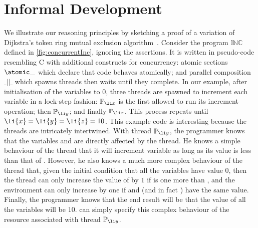 \chapter{Informal Development}\label{sec:intuition}
We illustrate our \colosl  reasoning principles  by
sketching a proof of a variation of Dijkstra's token ring mutual
exclusion algorithm~\cite{dijkstra74}.  Consider the program
$\mathbb{INC}$ defined in \fig\ref{fig:concurrentInc}, ignoring the
assertions. It is written in pseudo-code resembling C with additional
constructs for concurrency: atomic sections $\atomic \_$ which
declare that code behaves atomically; and
parallel composition $\_ ||\_ $  which spawns threads then waits until
they complete. In our example, after
initialisation of the variables to $0$, three threads are spawned to
increment each variable in a lock-step fashion: $\mathbb{P}_{\li x}$
is the first allowed to run its increment operation; then
$\mathbb{P}_{\li y}$; and finally $\mathbb{P}_{\li z}$. This process
repeats until $\li{x} = \li{y} = \li{z} = 10$.  This example code is
interesting because the threads are intricately intertwined. With
thread $\mathbb{P}_{\li y}$, the programmer knows that the variables
 and
 are 
directly affected by the thread. He knows a simple behaviour of the thread that it will
increment variable   as long as its value is less than that of .
However, he also knows a much more complex behaviour  of the 
thread that, given the initial condition that all
the variables have value $0$, then the thread can only increase the
value of  by
$1$ if  is one more than ,  and the environment can only
increase  by one if  and  (and in fact ) have
the same value. Finally, the programmer knows that the end result will
be that the value of all the variables will
be $10$. \colosl can simply specify   this complex
behaviour of the resource associated with thread $\mathbb{P}_{\li y}$.
%
